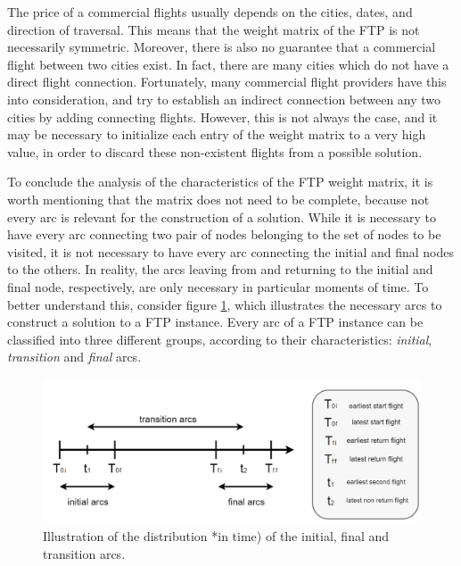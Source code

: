 The price of a commercial flights usually depends on the cities, dates, and  direction of traversal. This means that the weight matrix of the FTP is not necessarily symmetric. Moreover, there is also no guarantee that a commercial flight between two cities exist. In fact, there are many cities which do not have a direct flight connection. Fortunately, many commercial flight providers have this into consideration, and try to establish an indirect connection between any two cities by adding connecting flights. However, this is not always the case, and it may be necessary to initialize each entry of the weight matrix to a very high value, in order to discard these non-existent flights from a possible solution.  

To conclude the analysis of the characteristics of the FTP weight matrix, it is worth mentioning that the matrix does not need to be complete, because not every arc is relevant for the construction of a solution. While it is necessary to have every arc connecting two pair of nodes belonging to the set of nodes to be visited, it is not necessary to have every arc connecting the initial and final nodes to the others. In reality, the arcs leaving from and returning to the initial and final node, respectively, are only necessary in particular moments of time. To better understand this, consider figure \ref{fig:arc_families}, which illustrates the necessary arcs to construct a solution to a FTP instance. Every arc of a FTP instance can be classified into three different groups, according to their characteristics: \textit{initial}, \textit{transition} and \textit{final} arcs.

\begin{figure}[htpb]
  \centering
  \includegraphics[width=\textwidth]{./Figures/system_design/tempos.png}
  \caption{Illustration of the distribution *in time) of the initial, final and transition arcs.}
  \label{fig:arc_families} 
\end{figure}

